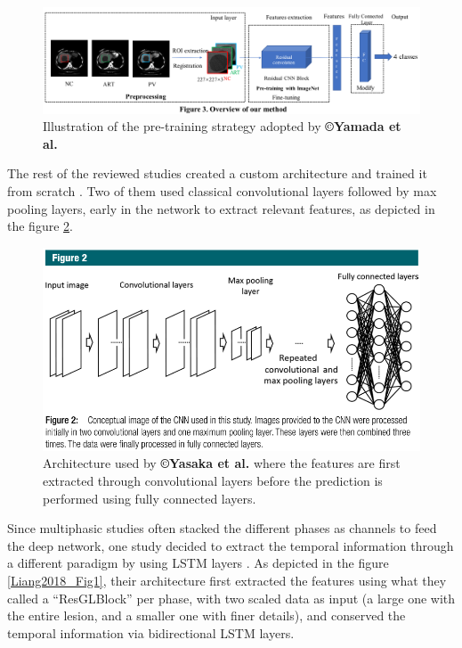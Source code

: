 \begin{figure}[th!]
\centering
\includegraphics[width=0.9\linewidth]{images/image6}
\caption{Illustration of the pre-training strategy adopted by \textbf{©Yamada et al.} \cite{Yamada2019}}
\label{Yamada2019_Fig3}
\end{figure}


The rest of the reviewed studies created a custom architecture and
trained it from scratch \cite{Yasaka2018a,Yasaka2018,Liang2018}.
Two of them used classical convolutional layers followed by max pooling
layers, early in the network to extract relevant features, as depicted
in the figure \ref{Yasaka2018_Fig2}.

\begin{figure}[th!]
\centering
\includegraphics[width=0.7\linewidth]{images/image10}
\caption{Architecture used by \textbf{©Yasaka et al.} where the features are first extracted through convolutional layers before the prediction is performed using fully connected layers. \cite{Yasaka2018}}
\label{Yasaka2018_Fig2}
\end{figure}

Since multiphasic studies often stacked the different phases as channels
to feed the deep network, one study decided to extract the temporal
information through a different paradigm by using LSTM layers \cite{Liang2018}. As depicted
in the figure \ref{Liang2018_Fig1}, their architecture first extracted the features using what they
called a ``ResGLBlock'' per phase, with two scaled data as input (a
large one with the entire lesion, and a smaller one with finer details),
and conserved the temporal information via bidirectional LSTM
layers.


